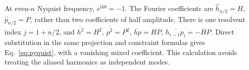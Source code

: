\documentclass[aps,pre,onecolumn,11pt,notitlepage,nofootinbib]{revtex4-2}
\newcommand{\mean}[1]{\overline{#1}}
\begin{document}
At even-$n$ Nyquist frequency, $e^{\mathrm{i}k\theta}=-1$. The Fourier coefficients are $\widehat h_{n/2}=H$, $\widehat p_{n/2}=P$, rather than two coefficients of half amplitude. There is one resolvent index $j=1+n/2$, and $\mean{h^2}=H^2$, $\mean{p^2}=P^2$, $\mean{hp}=HP$, $\mean{h_{i-1}p_i}=-HP$. Direct substitution in the same projection and constraint formulas gives Eq.~\eqref{eq:nyquist}, with a vanishing mixed coefficient. This calculation avoids treating the aliased harmonics as independent modes.


\end{document}
